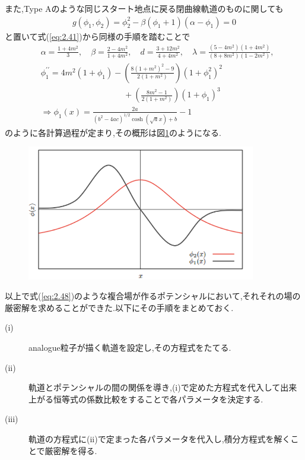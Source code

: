 \documentclass[dvipdfmx,11pt,a4paper]{jsbook}
\begin{document}
また,Type Aのような同じスタート地点に戻る閉曲線軌道のものに関しても
\begin{align}
    g\left(\phi_{1}, \phi_{2}\right)=\phi_{2}^{2}-\beta\left(\phi_{1}+1\right)\left(\alpha-\phi_{1}\right)=0
\end{align}
と置いて式(\ref{eq:2.41})から同様の手順を踏むことで
\begin{align}
     & \alpha                    =\frac{1+4 m^{2}}{3}, \quad \beta=\frac{2-4 m^{2}}{1+4 m^{2}}, \quad d=\frac{3+12 m^{2}}{4+4 m^{2}},\quad \lambda=\frac{\left(5-4 m^{2}\right)\left(1+4 m^{2}\right)}{\left(8+8 m^{2}\right)\left(1-2 m^{2}\right)}, \\
     & \phi_{1}^{\prime \prime}= 4 m^{2}\left(1+\phi_{1}\right)-\left(\frac{8\left(1+m^{2}\right)^{2}-9}{2\left(1+m^{2}\right)}\right)\left(1+\phi_{1}^{2}\right)^{2}\nonumber                                                                        \\
     & \qquad\ \ \ \ \ \ \ \ \ \ \ \ \ \ \ \ \ \ \ \ \ \ \ \ \ \ \ \ \ \ \ \ \ \ \ \ +\left(\frac{8 m^{2}-1}{2\left(1 + m^{2}\right)}\right)\left(1+\phi_{1}\right)^{3}                                                                               \\
     & \Rightarrow \phi_{1}(x)=\frac{2 a}{\left(b^{2}-4 a c\right)^{1 / 2} \cosh (\sqrt{a} x)+b}-1
\end{align}
のように各計算過程が定まり,その概形は図\ref{2-coupled-phi_typeA}のようになる.
\begin{figure}[H]
    \centering
    \includegraphics[width=10cm]{figure/2-coupled-phi_typeA.png}
    \caption{}
    \label{2-coupled-phi_typeA}
\end{figure}
以上で式(\ref{eq:2.48})のような複合場が作るポテンシャルにおいて,それそれの場の厳密解を求めることができた.以下にその手順をまとめておく.
\begin{screen}
    \begin{description}
        \item[(i)] analogue粒子が描く軌道を設定し,その方程式をたてる.
        \item[(ii)] 軌道とポテンシャルの間の関係を導き,(i)で定めた方程式を代入して出来上がる恒等式の係数比較をすることで各パラメータを決定する.
        \item[(iii)] 軌道の方程式に(ii)で定まった各パラメータを代入し,積分方程式を解くことで厳密解を得る.
    \end{description}
\end{screen}
\end{document}
